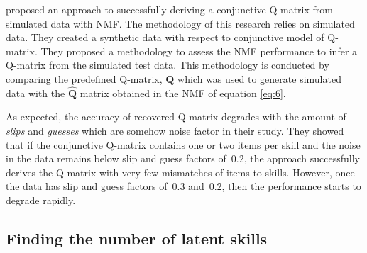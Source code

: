 \citet{desmarais2012mapping} proposed an approach to successfully deriving a conjunctive Q-matrix from simulated data with NMF. The methodology of this research relies on simulated data. They created a synthetic data with respect to conjunctive model of Q-matrix. They proposed a methodology to assess the NMF performance to infer a Q-matrix from the simulated test data. This methodology is conducted by comparing the predefined Q-matrix, $\mathbf{Q}$ which was used to generate simulated data with the $\hat{\mathbf{Q}}$ matrix obtained in the NMF of equation \ref{eq:6}.

As expected, the accuracy of recovered Q-matrix degrades with the amount of \textit{slips} and \textit{guesses} which are somehow noise factor in their study. They showed that if the conjunctive Q-matrix contains one or two items per skill and the noise in the data remains below slip and guess factors of~$0.2$, the approach successfully derives the Q-matrix with very few mismatches of items to skills. However, once the data has slip and guess factors of~$0.3$ and~$0.2$, then the performance starts to degrade rapidly.


\subsection{Finding the number of latent skills}
\label{EDM2012}


